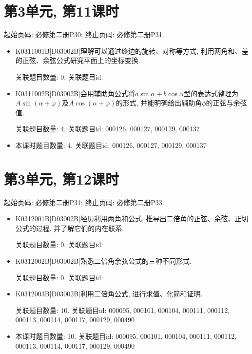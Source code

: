 \section*{第3单元, 第11课时}
起始页码: 必修第二册P30; 终止页码: 必修第二册P31.
\begin{itemize}
\item K0311001B|D03002B|理解可以通过终边的旋转、对称等方式, 利用两角和、差的正弦、余弦公式研究平面上的坐标变换.

关联题目数量: 0. 关联题目id: 

\item K0311002B|D03002B|会用辅助角公式将$a\sin\alpha+b\cos\alpha$型的表达式整理为$A\sin(\alpha+\varphi)$及$A\cos(\alpha+\varphi)$的形式, 并能明确给出辅助角$\phi$的正弦与余弦值.

关联题目数量: 4. 关联题目id: 000126, 000127, 000129, 000137

\item 本课时题目数量: 4. 关联题目id: 000126, 000127, 000129, 000137

\end{itemize}

\section*{第3单元, 第12课时}
起始页码: 必修第二册P31; 终止页码: 必修第二册P33.
\begin{itemize}
\item K0312001B|D03002B|经历利用两角和公式, 推导出二倍角的正弦、余弦、正切公式的过程, 并了解它们的内在联系.

关联题目数量: 0. 关联题目id: 

\item K0312002B|D03002B|熟悉二倍角余弦公式的三种不同形式.

关联题目数量: 0. 关联题目id: 

\item K0312003B|D03002B|利用二倍角公式, 进行求值、化简和证明.

关联题目数量: 10. 关联题目id: 000095, 000101, 000104, 000111, 000112, 000113, 000114, 000117, 000129, 000490

\item 本课时题目数量: 10. 关联题目id: 000095, 000101, 000104, 000111, 000112, 000113, 000114, 000117, 000129, 000490

\end{itemize}

